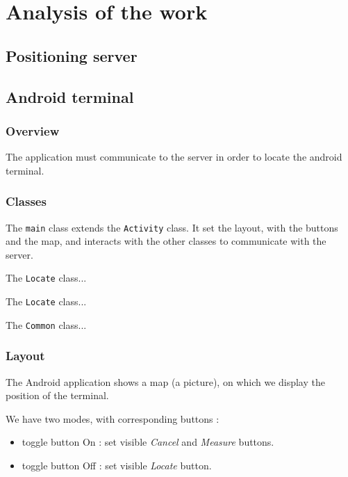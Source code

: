 \section{Analysis of the work}

\subsection{Positioning server}

\subsection{Android terminal}

\subsubsection{Overview}

The application must communicate to the server in order to locate the android
terminal. 

\subsubsection{Classes}

The \verb+main+ class extends the \verb+Activity+ class. It set the layout, with
the buttons and the map, and interacts with the other classes to communicate
with the server.

The \verb+Locate+ class...

The \verb+Locate+ class...

The \verb+Common+ class...

\subsubsection{Layout}

The Android application shows a map (a picture), on which we display the
position of the terminal.

We have two modes, with corresponding buttons :

\begin{itemize}
    \item toggle button On : set visible \textit{Cancel} and \textit{Measure}
        buttons.
    \item toggle button Off : set visible \textit{Locate} button.
\end{itemize}

